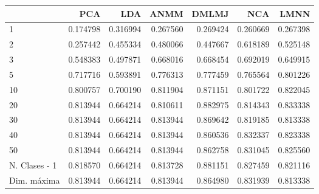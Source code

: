\begin{tabular}{lrrrrrr}
\toprule
{} &       PCA &       LDA &      ANMM &     DMLMJ &       NCA &      LMNN \\
\midrule
1             &  0.174798 &  0.316994 &  0.267560 &  0.269424 &  0.260669 &  0.267398 \\
2             &  0.257442 &  0.455334 &  0.480066 &  0.447667 &  0.618189 &  0.525148 \\
3             &  0.548383 &  0.497871 &  0.668016 &  0.668454 &  0.692019 &  0.649915 \\
5             &  0.717716 &  0.593891 &  0.776313 &  0.777459 &  0.765564 &  0.801226 \\
10            &  0.800757 &  0.700190 &  0.811904 &  0.871151 &  0.801722 &  0.822045 \\
20            &  0.813944 &  0.664214 &  0.810611 &  0.882975 &  0.814343 &  0.833338 \\
30            &  0.813944 &  0.664214 &  0.813944 &  0.869642 &  0.819185 &  0.813338 \\
40            &  0.813944 &  0.664214 &  0.813944 &  0.860536 &  0.832337 &  0.823338 \\
50            &  0.813944 &  0.664214 &  0.813944 &  0.862758 &  0.831045 &  0.825560 \\
N. Clases - 1 &  0.818570 &  0.664214 &  0.813728 &  0.881151 &  0.827459 &  0.821116 \\
Dim. máxima   &  0.813944 &  0.664214 &  0.813944 &  0.864980 &  0.831939 &  0.813338 \\
\bottomrule
\end{tabular}
